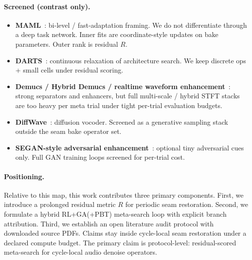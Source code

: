\paragraph{Screened (contrast only).}
\begin{itemize}
  \item \textbf{MAML}~\cite{finn2017}: bi-level / fast-adaptation framing. We do not differentiate through a deep task network. Inner fits are coordinate-style updates on bake parameters. Outer rank is residual $R$.
  \item \textbf{DARTS}~\cite{liu2019}: continuous relaxation of architecture search. We keep discrete ops + small cells under residual scoring.
  \item \textbf{Demucs / Hybrid Demucs / realtime waveform enhancement}~\cite{dfossez2019,dfossez2021,dfossez2020}: strong separators and enhancers, but full multi-scale / hybrid STFT stacks are too heavy per meta trial under tight per-trial evaluation budgets.
  \item \textbf{DiffWave}~\cite{kong2021}: diffusion vocoder. Screened as a generative sampling stack outside the seam bake operator set.
  \item \textbf{SEGAN-style adversarial enhancement}~\cite{pascual2017}: optional tiny adversarial cues only. Full GAN training loops screened for per-trial cost.
\end{itemize}

\paragraph{Positioning.}
Relative to this map, this work contributes three primary components.
First, we introduce a prolonged residual metric $R$ for periodic seam restoration.
Second, we formulate a hybrid RL+GA(+PBT) meta-search loop with explicit branch attribution.
Third, we establish an open literature audit protocol with downloaded source PDFs.
Claims stay inside cycle-local seam restoration under a declared compute budget.
The primary claim is protocol-level: residual-scored meta-search for cycle-local audio denoise operators.
